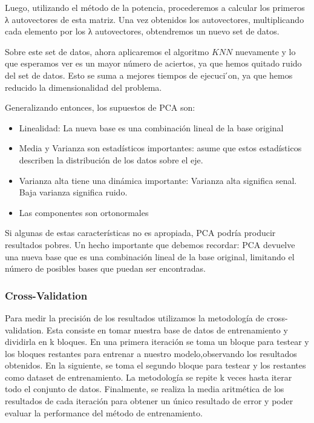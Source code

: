 Luego, utilizando el método de la potencia, procederemos a calcular los primeros λ autovectores de esta matriz. Una vez obtenidos los
autovectores, multiplicando cada elemento por los λ autovectores, obtendremos un nuevo set de datos.

Sobre este set de datos, ahora aplicaremos el algoritmo $KNN$ nuevamente y lo que esperamos ver es un mayor número de aciertos, ya que hemos quitado ruido del set de datos. Esto se suma a mejores tiempos de ejecuci ́on, ya que hemos reducido la dimensionalidad del problema.

Generalizando entonces, los supuestos de PCA son:

\begin{itemize}
\item Linealidad: La nueva base es una combinación lineal de la base original
\item Media y Varianza son estadísticos importantes: asume que estos estadísticos describen la distribución de los datos sobre el eje.
\item Varianza alta tiene una dinámica importante: Varianza alta significa senal. Baja varianza significa ruido.
\item Las componentes son ortonormales
\end{itemize}

Si algunas de estas características no es apropiada, PCA podría producir resultados pobres. Un hecho importante que debemos recordar: PCA devuelve una nueva base que es una combinación lineal de la base original, limitando el número de posibles bases que puedan ser encontradas.


\subsubsection {Cross-Validation}

Para medir la precisión de los resultados utilizamos la metodología de cross-validation. Esta consiste en tomar nuestra base de datos de entrenamiento y dividirla en k bloques. En una primera iteración se toma un bloque para testear y los bloques restantes para entrenar a nuestro modelo,observando los resultados obtenidos. En la siguiente, se toma el segundo bloque para testear y los
restantes como dataset de entrenamiento.
La metodología se repite k veces hasta iterar todo el conjunto de datos. Finalmente, se realiza la media aritmética de los resultados de cada iteración para obtener un único resultado de error y poder evaluar la performance del método de entrenamiento.

